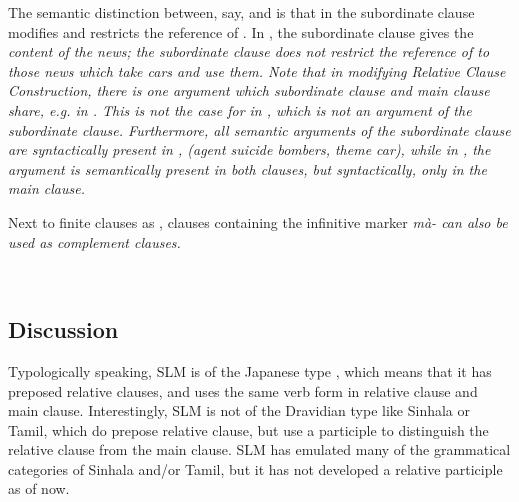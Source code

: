 The semantic distinction between, say,  and  is that in  the subordinate clause modifies and restricts the reference of . In , the subordinate clause gives the \em content \em of the news; the subordinate clause does not restrict the reference of  to those news which take cars and use them. Note that in modifying Relative Clause Construction, there is one argument which subordinate clause and main clause share, e.g.  in . This is not the case for  in , which is not an argument of the subordinate clause. Furthermore, all semantic arguments of the subordinate clause are syntactically present in , (agent \em suicide bombers\em, theme \em car\em), while in , the argument  is semantically present in both clauses, but syntactically, only in the main clause.

Next to finite clauses as , clauses containing the infinitive marker \em mà- \em can also be used as complement clauses.

\\

 

\subsection{Discussion}
Typologically speaking,  SLM is of the Japanese type \citep[50f]{Lehmann1984}, which means that it has preposed relative clauses, and uses the same verb form in relative clause and main clause. Interestingly, SLM is  not of the Dravidian type \citep[70f]{Lehmann1984} like Sinhala or Tamil, which do  prepose relative clause, but use a  participle to distinguish the relative clause from the main clause. SLM has emulated many of the grammatical categories of Sinhala and/or Tamil, but it has not developed a relative participle as of now.

